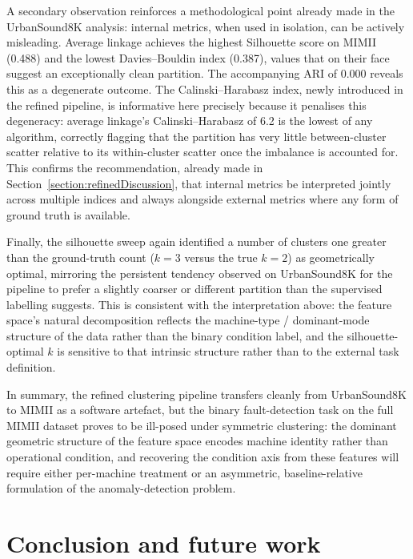 \documentclass[runningheads,a4paper,11pt]{report}
\begin{document}
A secondary observation reinforces a methodological point already made in the UrbanSound8K analysis: internal metrics, when used in isolation, can be actively misleading. Average linkage achieves the highest Silhouette score on MIMII (0.488) and the lowest Davies--Bouldin index (0.387), values that on their face suggest an exceptionally clean partition. The accompanying ARI of 0.000 reveals this as a degenerate outcome. The Calinski--Harabasz index, newly introduced in the refined pipeline, is informative here precisely because it penalises this degeneracy: average linkage's Calinski--Harabasz of 6.2 is the lowest of any algorithm, correctly flagging that the partition has very little between-cluster scatter relative to its within-cluster scatter once the imbalance is accounted for. This confirms the recommendation, already made in Section~\ref{section:refinedDiscussion}, that internal metrics be interpreted jointly across multiple indices and always alongside external metrics where any form of ground truth is available.

Finally, the silhouette sweep again identified a number of clusters one greater than the ground-truth count ($k = 3$ versus the true $k = 2$) as geometrically optimal, mirroring the persistent tendency observed on UrbanSound8K for the pipeline to prefer a slightly coarser or different partition than the supervised labelling suggests. This is consistent with the interpretation above: the feature space's natural decomposition reflects the machine-type / dominant-mode structure of the data rather than the binary condition label, and the silhouette-optimal $k$ is sensitive to that intrinsic structure rather than to the external task definition.

In summary, the refined clustering pipeline transfers cleanly from UrbanSound8K to MIMII as a software artefact, but the binary fault-detection task on the full MIMII dataset proves to be ill-posed under symmetric clustering: the dominant geometric structure of the feature space encodes machine identity rather than operational condition, and recovering the condition axis from these features will require either per-machine treatment or an asymmetric, baseline-relative formulation of the anomaly-detection problem.





\chapter{Conclusion and future work}
\label{chapter:concl}
\end{document}
